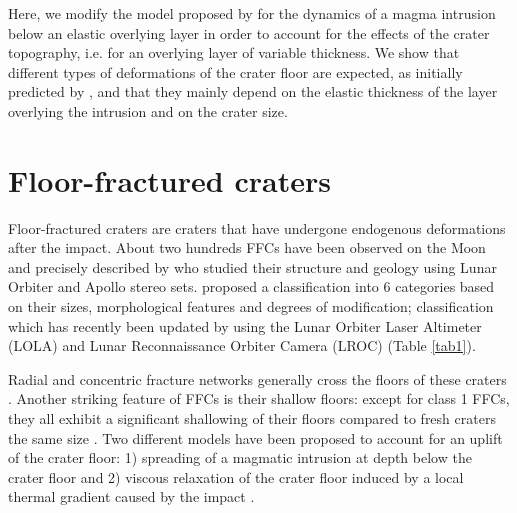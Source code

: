\begin{article}
  Here, we  modify the model  proposed by \citet{Michaut2011}  for the
  dynamics of  a magma intrusion  below an elastic overlying  layer in
  order to account for the effects  of the crater topography, i.e. for
  an overlying  layer of  variable thickness.  We show  that different
  types of deformations of the crater floor are expected, as initially
  predicted by \citet{Schultz1976}, and that they mainly depend on the
  elastic thickness  of the layer  overlying the intrusion and  on the
  crater size.

  \section{Floor-fractured craters}
  \label{FFC}


  Floor-fractured craters  are craters that have  undergone endogenous
  deformations after  the impact.  About  two hundreds FFCs  have been
  observed on the Moon  and precisely described by \citet{Schultz1976}
  who  studied their  structure and  geology using  Lunar Orbiter  and
  Apollo stereo  sets.  \citet{Schultz1976} proposed  a classification
  into 6 categories  based on their sizes,  morphological features and
  degrees  of modification;  classification  which  has recently  been
  updated  by  \citet{Jozwiak2012}  using   the  Lunar  Orbiter  Laser
  Altimeter  (LOLA) and  Lunar  Reconnaissance  Orbiter Camera  (LROC)
  (Table \ref{tab1}).
	
  Radial and  concentric fracture networks generally  cross the floors
  of these  craters \citep{Schultz1976}.  Another striking  feature of
  FFCs is  their shallow  floors: except  for class  1 FFCs,  they all
  exhibit a significant  shallowing of their floors  compared to fresh
  craters   the   same  size   \citep{Schultz1976,Jozwiak2012}.    Two
  different models have been proposed to  account for an uplift of the
  crater floor:  1) spreading of  a magmatic intrusion at  depth below
  the                           crater                           floor
  \citep{Schultz1976,Wichman1993,Wichman1995b,Wichman1996,Jozwiak2012}
  and 2)  viscous relaxation of  the crater  floor induced by  a local
  thermal       gradient       caused        by       the       impact
  \citep{Hall1981a,Wichman1995b}.
	

\end{article}
